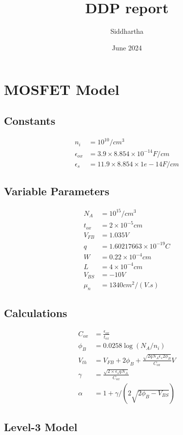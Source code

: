 \documentclass{article}
\title{DDP report}
\author{Siddhartha }
\date{June 2024}
\begin{document}
\maketitle
\tableofcontents
\newpage
\section{MOSFET Model}
\subsection*{Constants}
\begin{align}    
    n_i &= 10^{10}/cm^3 \\
    \epsilon_{ox} &= 3.9\times8.854\times10^{-14} F/cm  \\
    \epsilon_s &= 11.9\times8.854\times1e-14 F/cm  
\end{align}

\subsection*{Variable Parameters}
\begin{align}
    N_A &= 10^{15} /cm^{3} \\
    t_{ox} &= 2\times10^{-5} cm \\
    V_{FB} &= 1.035  V \\
    q &= 1.60217663 \times 10^{-19}  C \\
    W &= 0.22 \times 10^{-4} cm \\
    L &= 4  \times 10^{-4}  cm \\
    V_{BS} &= -10 V \\
    \mu_n  &= 1340 cm^2/(V.s) 
\end{align}
\subsection*{Calculations}
\begin{align}
    C_{ox} &= \frac{\epsilon_{ox}}{t_{ox}} \\
    \phi_B &= 0.0258\log(N_A/n_i)\\
    V_{th} &= V_{FB} + 2 \phi_{B} + \frac{\sqrt{2q N_A \epsilon_s 2 \phi_B}}{C_{ox}}  V  \\
    \gamma &= \frac{\sqrt{2\times\epsilon_s q N_A}}{C_{ox}} \\
    \alpha &= 1 + \gamma/(2\sqrt{2\phi_B-V_{BS}}) 
\end{align}
\subsection*{Level-3 Model}
\end{document}
